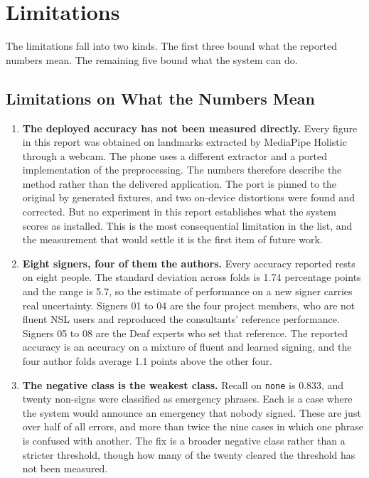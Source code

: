 \section{Limitations}

The limitations fall into two kinds. The first three bound what the reported numbers mean. The remaining five bound what the system can do.

\subsection{Limitations on What the Numbers Mean}

\begin{enumerate}
    \item \textbf{The deployed accuracy has not been measured directly.} Every figure in this report was obtained on landmarks extracted by MediaPipe Holistic through a webcam. The phone uses a different extractor and a ported implementation of the preprocessing. The numbers therefore describe the method rather than the delivered application. The port is pinned to the original by generated fixtures, and two on-device distortions were found and corrected. But no experiment in this report establishes what the system scores as installed. This is the most consequential limitation in the list, and the measurement that would settle it is the first item of future work.

    \item \textbf{Eight signers, four of them the authors.} Every accuracy reported rests on eight people. The standard deviation across folds is 1.74 percentage points and the range is 5.7, so the estimate of performance on a new signer carries real uncertainty. Signers 01 to 04 are the four project members, who are not fluent NSL users and reproduced the consultants' reference performance. Signers 05 to 08 are the Deaf experts who set that reference. The reported accuracy is an accuracy on a mixture of fluent and learned signing, and the four author folds average 1.1 points above the other four.

    \item \textbf{The negative class is the weakest class.} Recall on \texttt{none} is 0.833, and twenty non-signs were classified as emergency phrases. Each is a case where the system would announce an emergency that nobody signed. These are just over half of all errors, and more than twice the nine cases in which one phrase is confused with another. The fix is a broader negative class rather than a stricter threshold, though how many of the twenty cleared the threshold has not been measured.
\end{enumerate}

